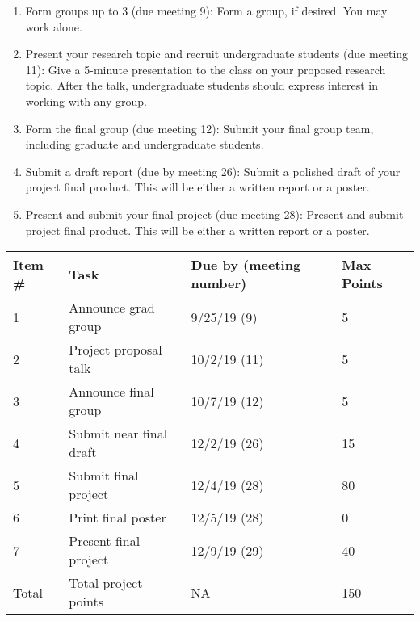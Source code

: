 \documentclass[11pt,onecolumn]{article}
\begin{document}
\begin{enumerate}
  \itemsep0em
\item Form groups up to 3 (due meeting 9): Form a group, if desired. You may work alone.
\item Present your research topic and recruit undergraduate students (due meeting 11): Give a 5-minute presentation to the class on your proposed research topic. After the talk, undergraduate students should express interest in working with any group.
\item Form the final group (due meeting 12): Submit your final group team, including graduate and undergraduate students.
\item Submit a draft report (due by meeting 26): Submit a polished draft of your project final product. This will be either a written report or a poster.
\item Present and submit your final project (due meeting 28): Present and submit project final product. This will be either a written report or a poster.
  
\end{enumerate}

\begin{table}
  \centering
  \begin{tabular}{l|lll}
    Item \# & Task & Due by (meeting number) & Max Points \\
    \hline
    1 & Announce grad group & 9/25/19 (9) & 5 \\
    2 & Project proposal talk & 10/2/19 (11) & 5 \\
    3 & Announce final group & 10/7/19 (12) & 5 \\
    4 & Submit near final draft & 12/2/19 (26) & 15 \\
    5 & Submit final project & 12/4/19 (28) & 80 \\
    6 & Print final poster & 12/5/19 (28) & 0 \\
    7 & Present final project & 12/9/19 (29) & 40 \\
    \hline
    Total & Total project points & NA & 150 \\
  \end{tabular}
\end{table}
\end{document}
